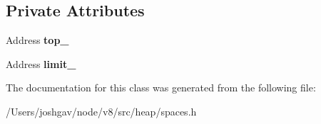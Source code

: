 \subsection*{Private Attributes}
\begin{DoxyCompactItemize}
\item 
Address {\bfseries top\+\_\+}\hypertarget{classv8_1_1internal_1_1_allocation_info_a1e162eb9f63ebb1dc1828e233ad44138}{}\label{classv8_1_1internal_1_1_allocation_info_a1e162eb9f63ebb1dc1828e233ad44138}

\item 
Address {\bfseries limit\+\_\+}\hypertarget{classv8_1_1internal_1_1_allocation_info_aecc7f293097e731c1b8eabb846d05642}{}\label{classv8_1_1internal_1_1_allocation_info_aecc7f293097e731c1b8eabb846d05642}

\end{DoxyCompactItemize}


The documentation for this class was generated from the following file\+:\begin{DoxyCompactItemize}
\item 
/\+Users/joshgav/node/v8/src/heap/spaces.\+h\end{DoxyCompactItemize}
